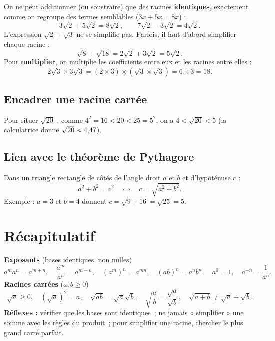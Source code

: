 \documentclass[../main.tex]{subfiles}
\begin{document}
On ne peut additionner (ou soustraire) que des racines \textbf{identiques}, exactement comme on regroupe des termes semblables ($3x + 5x = 8x$) :
\[
3\sqrt{2} + 5\sqrt{2} = 8\sqrt{2}, \qquad 7\sqrt{2} - 3\sqrt{2} = 4\sqrt{2}.
\]
L'expression $\sqrt{2}+\sqrt{3}$ ne se simplifie pas. Parfois, il faut d'abord simplifier chaque racine :
\[
\sqrt{8} + \sqrt{18} = 2\sqrt{2} + 3\sqrt{2} = 5\sqrt{2}.
\]
Pour \textbf{multiplier}, on multiplie les coefficients entre eux et les racines entre elles :
\[
2\sqrt{3} \times 3\sqrt{3} = (2\times3)\times(\sqrt{3}\times\sqrt{3}) = 6 \times 3 = 18.
\]

\subsection{Encadrer une racine carrée}

Pour situer $\sqrt{20}$ : comme $4^2 = 16 < 20 < 25 = 5^2$, on a $4 < \sqrt{20} < 5$ (la calculatrice donne $\sqrt{20} \approx 4{,} 47$).

\subsection{Lien avec le théorème de Pythagore}

Dans un triangle rectangle de côtés de l'angle droit $a$ et $b$ et d'hypoténuse $c$ :
\[
a^2 + b^2 = c^2 \quad\Longleftrightarrow\quad c = \sqrt{a^2 + b^2}.
\]
Exemple : $a = 3$ et $b = 4$ donnent $c = \sqrt{9+16} = \sqrt{25} = 5$.

\section{Récapitulatif}

\begin{tcolorbox}[colback=gray!6,colframe=gray!60!black,title={\bfseries À retenir}]
\textbf{Exposants} (bases identiques, non nulles)
\[
a^m a^n = a^{m+n}, \quad \frac{a^m}{a^n} = a^{m-n}, \quad (a^m)^n = a^{mn}, \quad (ab)^n = a^n b^n, \quad a^0 = 1, \quad a^{-n} = \frac{1}{a^n}.
\]
\textbf{Racines carrées} ($a, b \geq 0$)
\[
\sqrt{a} \geq 0, \quad \left(\sqrt{a}\right)^2 = a, \quad \sqrt{ab} = \sqrt{a}\sqrt{b}, \quad \sqrt{\frac{a}{b}} = \frac{\sqrt{a}}{\sqrt{b}}, \quad \sqrt{a+b} \neq \sqrt{a}+\sqrt{b}.
\]
\textbf{Réflexes :} vérifier que les bases sont identiques~; ne jamais « simplifier » une somme avec les règles du produit~; pour simplifier une racine, chercher le plus grand carré parfait.
\end{tcolorbox}
\end{document}
